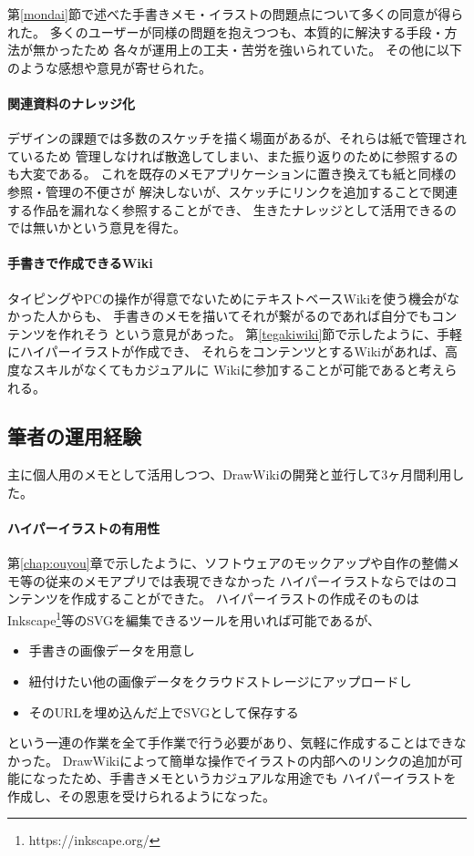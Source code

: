 第\ref{mondai}節で述べた手書きメモ・イラストの問題点について多くの同意が得られた。
多くのユーザーが同様の問題を抱えつつも、本質的に解決する手段・方法が無かったため
各々が運用上の工夫・苦労を強いられていた。
その他に以下のような感想や意見が寄せられた。

\paragraph*{関連資料のナレッジ化}
デザインの課題では多数のスケッチを描く場面があるが、それらは紙で管理されているため
管理しなければ散逸してしまい、また振り返りのために参照するのも大変である。
これを既存のメモアプリケーションに置き換えても紙と同様の参照・管理の不便さが
解決しないが、スケッチにリンクを追加することで関連する作品を漏れなく参照することができ、
生きたナレッジとして活用できるのでは無いかという意見を得た。

\paragraph*{手書きで作成できるWiki}
タイピングやPCの操作が得意でないためにテキストベースWikiを使う機会がなかった人からも、
手書きのメモを描いてそれが繋がるのであれば自分でもコンテンツを作れそう
という意見があった。
第\ref{tegakiwiki}節で示したように、手軽にハイパーイラストが作成でき、
それらをコンテンツとするWikiがあれば、高度なスキルがなくてもカジュアルに
Wikiに参加することが可能であると考えられる。


\subsection{筆者の運用経験}
主に個人用のメモとして活用しつつ、DrawWikiの開発と並行して3ヶ月間利用した。


\paragraph*{ハイパーイラストの有用性}
第\ref{chap:ouyou}章で示したように、ソフトウェアのモックアップや自作の整備メモ等の従来のメモアプリでは表現できなかった
ハイパーイラストならではのコンテンツを作成することができた。
ハイパーイラストの作成そのものはInkscape\footnote{https://inkscape.org/}等のSVGを編集できるツールを用いれば可能であるが、
\begin{itemize}
    \item 手書きの画像データを用意し
    \item 紐付けたい他の画像データをクラウドストレージにアップロードし
    \item そのURLを埋め込んだ上でSVGとして保存する
\end{itemize}
という一連の作業を全て手作業で行う必要があり、気軽に作成することはできなかった。
DrawWikiによって簡単な操作でイラストの内部へのリンクの追加が可能になったため、手書きメモというカジュアルな用途でも
ハイパーイラストを作成し、その恩恵を受けられるようになった。

